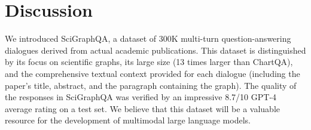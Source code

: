 \documentclass{article}
\begin{document}
\section{Discussion}

We introduced SciGraphQA, a dataset of 300K multi-turn question-answering dialogues derived from actual academic publications. This dataset is distinguished by its focus on scientific graphs, its large size (13 times larger than ChartQA), and the comprehensive textual context provided for each dialogue (including the paper's title, abstract, and the paragraph containing the graph). The quality of the responses in SciGraphQA was verified by an impressive 8.7/10 GPT-4 average rating on a test set. We believe that this dataset will be a valuable resource for the development of multimodal large language models.
\end{document}
